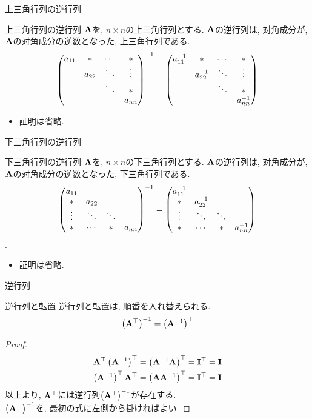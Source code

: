 \documentclass[dvipdfmx,notheorems,t]{beamer}
\begin{document}
\begin{frame}{上三角行列の逆行列}
\begin{block}{上三角行列の逆行列}
  $\vb{A}$を, $n \times n$の上三角行列とする.
  $\vb{A}$の逆行列は, 対角成分が, $\vb{A}$の対角成分の逆数となった, 上三角行列である.
  $$\mqty(a_{11} & * & \cdots & * \\ & a_{22} & \ddots & \vdots \\
    & & \ddots & * \\ & & & a_{nn})^{-1}
    = \mqty(a_{11}^{-1} & * & \cdots & * \\ & a_{22}^{-1} & \ddots & \vdots \\
    & & \ddots & * \\ & & & a_{nn}^{-1})$$
\end{block}

\begin{itemize}
  \item 証明は省略.
\end{itemize}
\end{frame}

\begin{frame}{下三角行列の逆行列}
\begin{block}{下三角行列の逆行列}
  $\vb{A}$を, $n \times n$の下三角行列とする.
  $\vb{A}$の逆行列は, 対角成分が, $\vb{A}$の対角成分の逆数となった, 下三角行列である.
  $$\mqty(a_{11} \\ * & a_{22} \\ \vdots & \ddots & \ddots \\ * & \cdots & * & a_{nn})^{-1}
    = \mqty(a_{11}^{-1} \\ * & a_{22}^{-1} \\ \vdots & \ddots & \ddots \\ * & \cdots & * & a_{nn}^{-1})$$.
\end{block}

\begin{itemize}
  \item 証明は省略.
\end{itemize}
\end{frame}

\begin{frame}{逆行列}
\begin{block}{逆行列と転置}
  逆行列と転置は, 順番を入れ替えられる.
  $$\left( \vb{A}^\top \right)^{-1} = \left( \vb{A}^{-1} \right)^\top$$
\end{block}

\begin{proof}
  \begin{align*}
    \vb{A}^\top \left( \vb{A}^{-1} \right)^\top
      &= \left( \vb{A}^{-1} \vb{A} \right)^\top = \vb{I}^\top = \vb{I} \\
    \left( \vb{A}^{-1} \right)^\top \vb{A}^\top
      &= \left( \vb{A} \vb{A}^{-1} \right)^\top = \vb{I}^\top = \vb{I}
  \end{align*}
  以上より, $\vb{A}^\top$には逆行列$\left( \vb{A}^\top \right)^{-1}$が存在する. \\
  $\left( \vb{A}^\top \right)^{-1}$を, 最初の式に左側から掛ければよい.
\end{proof}
\end{frame}
\end{document}
